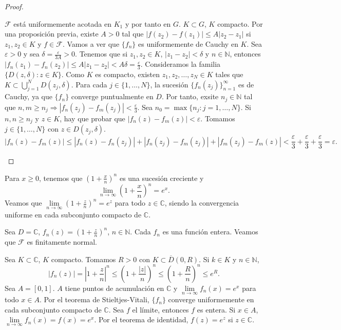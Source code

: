 \begin{proof}
\begin{enumerate}
              $\mathcal{F}$ está uniformemente acotada en $K_1$ y por tanto en $G$.
              $K \subset G$, $K$ compacto.
              Por una proposición previa, existe $A > 0$ tal que $|f(z_2)-f(z_1)| \leq A|z_2-z_1|$ si $z_1, z_2 \in K$ y $f \in \mathcal{F}$.
              Vamos a ver que $\{f_n\}$ es uniformemente de Cauchy en $K$.
              Sea $\varepsilon > 0$ y sea $\delta = \frac{\varepsilon}{3A} > 0$.
              Tenemos que si $z_1, z_2 \in K$, $|z_1-z_2| < \delta$ y $n \in \mathbb{N}$, entonces $|f_n(z_1)-f_n(z_2)| \leq A|z_1-z_2| < A\delta = \frac{\varepsilon}{3}$.
              Consideramos la familia $\{D(z, \delta) : z \in K\}$.
              Como $K$ es compacto, existen $z_1, z_2, \dots, z_N \in K$ tales que $K \subset \bigcup_{j=1}^N D(z_j, \delta)$.
              Para cada $j \in \{1, \dots, N\}$, la sucesión $\{f_n(z_j)\}_{n=1}^\infty$ es de Cauchy, ya que $\{f_n\}$ converge puntualmente en $D$.
              Por tanto, exsite $n_j \in \mathbb{N}$ tal que $n, m \geq n_j \Rightarrow |f_n(z_j)-f_m(z_j)| < \frac{\varepsilon}{3}$.
              Sea $n_0 = \max \{n_j : j = 1, \dots, N\}$.
              Si $n, n \geq n_j$ y $z \in K$, hay que probar que $|f_n(z)-f_m(z)| < \varepsilon$.
              Tomamos $j \in \{1, \dots, N\}$ con $z \in D(z_j, \delta)$.
              $$|f_n(z)-f_m(z)| \leq |f_n(z)-f_n(z_j)| + |f_n(z_j)-f_m(z_j)| + |f_m(z_j)-f_m(z)| < \frac{\varepsilon}{3} + \frac{\varepsilon}{3} + \frac{\varepsilon}{3} = \varepsilon.$$
    \end{enumerate}
\end{proof}

\begin{example}
    Para $x \geq 0$, tenemos que $\left(1 + \frac{x}{n}\right)^n$ es una sucesión creciente y
    $$\lim\limits_{n \to \infty} \left(1 + \frac{x}{n}\right)^n = e^x.$$
    Veamos que $\lim\limits_{n \to \infty} \left(1 + \frac{z}{n}\right)^n = e^z$ para todo $z \in \mathbb{C}$, siendo la convergencia uniforme en cada subconjunto compacto de $\mathbb{C}$.

    Sea $D = \mathbb{C}$, $f_n(z) = \left(1 + \frac{z}{n}\right)^n$, $n \in \mathbb{N}$.
    Cada $f_n$ es una función entera.
    Veamos que $\mathcal{F}$ es finitamente normal.

    Sea $K \subset \mathbb{C}$, $K$ compacto.
    Tomamos $R > 0$ con $K \subset \overline{D}(0, R)$.
    Si $k \in K$ y $n \in \mathbb{N}$,
    $$|f_n(z)| = \left|1 + \frac{z}{n}\right|^n \leq \left(1 + \frac{|z|}{n}\right)^n \leq \left(1 + \frac{R}{n}\right)^n \leq e^R.$$
    Sea $A = [0, 1]$.
    $A$ tiene puntos de acumulación en $\mathbb{C}$ y $\lim\limits_{n \to \infty} f_n(x) = e^x$ para todo $x \in A$.
    Por el teorema de Stieltjes-Vitali, $\{f_n\}$ converge uniformemente en cada subconjunto compacto de $\mathbb{C}$.
    Sea $f$ el límite, entonces $f$ es entera.
    Si $x \in A$, $\lim\limits_{n \to \infty} f_n(x) = f(x) = e^x$.
    Por el teorema de identidad, $f(z) = e^z$ si $z \in \mathbb{C}$.
\end{example}

